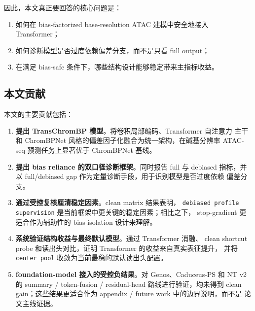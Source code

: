 \documentclass[11pt,a4paper]{ctexart}
\begin{document}
因此，本文真正要回答的核心问题是：
\begin{enumerate}[leftmargin=2em]
  \item 如何在 bias-factorized base-resolution ATAC 建模中安全地接入 Transformer；
  \item 如何诊断模型是否过度依赖偏差分支，而不是只看 full output；
  \item 在满足 bias-safe 条件下，哪些结构设计能够稳定带来主指标收益。
\end{enumerate}

\subsection{本文贡献}
\label{sec:contributions}

本文的主要贡献包括：

\begin{enumerate}[leftmargin=2em]
  \item \textbf{提出 TransChromBP 模型}。将卷积局部编码、Transformer 自注意力
  主干和 ChromBPNet 风格的偏差因子化融合为统一架构，在碱基分辨率 ATAC-seq
  预测任务上显著优于 ChromBPNet 基线。

  \item \textbf{提出 bias reliance 的双口径诊断框架}。同时报告 full 与 debiased
  指标，并以 full/debiased gap 作为定量诊断手段，用于识别模型是否过度依赖
  偏差分支。

  \item \textbf{通过受控复核厘清稳定因素}。clean matrix 结果表明，
  \texttt{debiased profile supervision} 是当前框架中更关键的稳定因素；相比之下，
  stop-gradient 更适合作为辅助性的 bias-isolation 设计来理解。

  \item \textbf{系统验证结构收益与最终默认模型}。通过 Transformer 消融、
  clean shortcut probe 和读出头对比，证明 Transformer 的收益来自真实表征提升，
  并将 \texttt{center pool} 收敛为当前最稳的默认读出头配置。

  \item \textbf{foundation-model 接入的受控负结果}。对 Genos、Caduceus-PS 和
  NT v2 的 summary / token-fusion / residual-head 路线进行验证，均未得到
  clean gain；这些结果更适合作为 appendix / future work 中的边界说明，而不是
  论文主线证据。
\end{enumerate}

\end{document}
